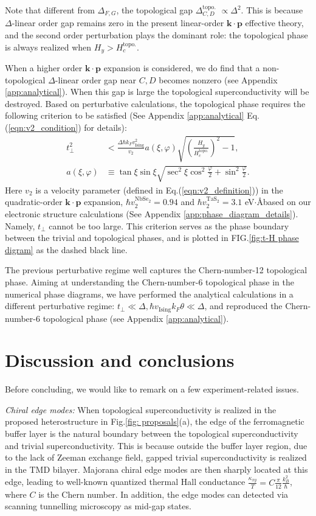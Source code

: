 Note that different from $\Delta_{F,G}$, the topological gap $\Delta^{\text{topo.}}_{C,D}$ $\propto\Delta^2$. This is because $\Delta$-linear order gap remains zero in the present linear-order $\bm{k\cdot p}$ effective theory, and the second order perturbation plays the dominant role: the topological phase is always realized when $H_y>H^{\text{topo.}}_{c}$.

When a higher order $\bm{k\cdot p}$ expansion is considered, we do find that a non-topological $\Delta$-linear order gap near $C,D$ becomes nonzero (see Appendix \ref{app:analytical}). When this gap is large the topological superconductivity will be destroyed. Based on perturbative calculations, the topological phase requires the following criterion to be satisfied (See Appendix \ref{app:analytical} Eq.(\ref{eqn:v2_condition}) for details):
\begin{align}
	t_\perp^2      & < \frac{\Delta \hbar k_F v^2_{\text{Ising}}}{v_2}a(\xi,\varphi)\sqrt{\left(\frac{H_y}{H_c^{\text{topo.}}}\right)^2-1},\label{Phase boundary} \\
	a(\xi,\varphi) & \equiv \tan\xi\sin\xi\sqrt{\sec^2\xi\cos^2\frac{\varphi}{2}+\sin^2\frac{\varphi}{2}}.\nonumber
\end{align}
Here $v_2$ is a velocity parameter (defined in Eq.(\ref{eqn:v2_definition})) in the quadratic-order $\bm{k\cdot p}$ expansion, $\hbar v^{\text{NbSe}_2}_2=0.94$ and $\hbar v^{\text{TaS}_2}_2=3.1$ eV$\cdot$\AA based on our electronic structure calculations (See Appendix \ref{app:phase_diagram_details}). Namely, $t_\perp$ cannot be too large. This criterion serves as the phase boundary between the trivial and topological phases, and is plotted in FIG.\ref{fig:t-H phase digram} as the dashed black line.

The previous perturbative regime well captures the Chern-number-12 topological phase. Aiming at understanding the Chern-number-6 topological phase in the numerical phase diagrams, we have performed the analytical calculations in a different perturbative regime: $t_\perp\ll\Delta,\hbar v_{\text{Ising}}k_F\theta\ll\Delta$, and reproduced the Chern-number-6 topological phase (see Appendix \ref{app:analytical}).


\section{Discussion and conclusions}
Before concluding, we would like to remark on a few experiment-related issues.

\emph{Chiral edge modes:} When topological superconductivity is realized in the proposed heterostructure in Fig.\ref{fig: proposals}(a), the edge of the ferromagnetic buffer layer is the natural boundary between the topological superconductivity and trivial superconductivity. This is because outside the buffer layer region, due to the lack of Zeeman exchange field, gapped trivial superconductivity is realized in the TMD bilayer. Majorana chiral edge modes are then sharply located at this edge, leading to well-known quantized thermal Hall conductance $\frac{\kappa_{xy}}{T}=C\frac{\pi}{12}\frac{k_B^2}{\hbar}$, where $C$ is the Chern number. In addition, the edge modes can detected via scanning tunnelling microscopy as mid-gap states.

